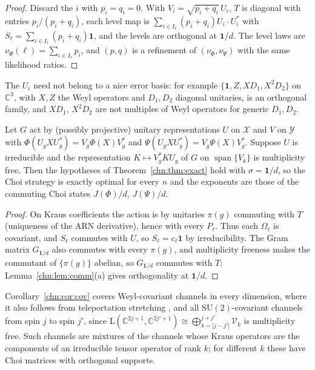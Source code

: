 \begin{proof}
Discard the $i$ with $p_i=q_i=0$. With $V_i=\sqrt{p_i+q_i}\,U_i$, $T$ is diagonal with entries $p_i/(p_i+q_i)$, each level map is $\sum_{i\in I_\ell}(p_i+q_i)U_i\cdot U_i^*$ with $S_\ell=\sum_{i\in I_\ell}(p_i+q_i)\mathbf 1$, and the levels are orthogonal at $\mathbf 1/d$. The level laws are $\nu_\Phi(\ell)=\sum_{i\in I_\ell}p_i$, and $(p,q)$ is a refinement of $(\nu_\Phi,\nu_\Psi)$ with the same likelihood ratios.
\end{proof}

The $U_i$ need not belong to a nice error basis: for example $\{\mathbf 1,Z,XD_1,X^2D_2\}$ on $\mathbb C^3$, with $X,Z$ the Weyl operators and $D_1,D_2$ diagonal unitaries, is an orthogonal family, and $XD_1$, $X^2D_2$ are not multiples of Weyl operators for generic $D_1,D_2$.

\begin{corollary}\label{chn:cor:cov}
Let $G$ act by (possibly projective) unitary representations $U$ on $\mathcal X$ and $V$ on $\mathcal Y$ with $\Phi(U_gXU_g^*)=V_g\Phi(X)V_g^*$ and $\Psi(U_gXU_g^*)=V_g\Psi(X)V_g^*$. Suppose $U$ is irreducible and the representation $K\mapsto V_g^*KU_g$ of $G$ on $\operatorname{span}\{V_k\}$ is multiplicity free. Then the hypotheses of Theorem~\ref{chn:thm:exact} hold with $\sigma=\mathbf 1/d$, so the Choi strategy is exactly optimal for every $n$ and the exponents are those of the commuting Choi states $J(\Phi)/d$, $J(\Psi)/d$.
\end{corollary}

\begin{proof}
On Kraus coefficients the action is by unitaries $\pi(g)$ commuting with $T$ (uniqueness of the ARN derivative), hence with every $P_\ell$. Thus each $\Omega_\ell$ is covariant, and $S_\ell$ commutes with $U$, so $S_\ell=c_\ell\mathbf 1$ by irreducibility. The Gram matrix $G_{\mathbf 1/d}$ also commutes with every $\pi(g)$, and multiplicity freeness makes the commutant of $\{\pi(g)\}$ abelian, so $G_{\mathbf 1/d}$ commutes with $T$; Lemma~\ref{chn:lem:comm}(a) gives orthogonality at $\mathbf 1/d$.
\end{proof}

\begin{remark}
Corollary~\ref{chn:cor:cov} covers Weyl-covariant channels in every dimension, where it also follows from teleportation stretching \cite{Pirandola2019}, and all $\mathrm{SU}(2)$-covariant channels from spin $j$ to spin $j'$, since $\mathrm L(\mathbb C^{2j+1},\mathbb C^{2j'+1})\cong\bigoplus_{k=|j-j'|}^{j+j'}\mathcal V_k$ is multiplicity free. Such channels are mixtures of the channels whose Kraus operators are the components of an irreducible tensor operator of rank $k$; for different $k$ these have Choi matrices with orthogonal supports.
\end{remark}

